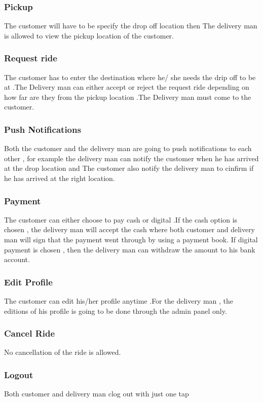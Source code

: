 \documentclass[12pt]{article}
\begin{document}
\subsubsection{Pickup} 
The customer will have to be specify the drop off location then The delivery man is allowed to view the pickup location of the customer.

\subsubsection{Request ride}
The customer has to enter the destination where he/ she needs the drip off to be at .The Delivery man can either accept or reject the request ride  depending on  how far are they from the pickup location .The Delivery man must come to the customer.

\subsubsection{Push Notifications}
Both the customer and the delivery man are going to push notifications to each other , for example the delivery man can notify the customer when he has arrived at the drop location and The customer also notify the delivery man to cinfirm if he has arrived at the right location.

\subsubsection{Payment}
The customer can either choose to pay cash or digital .If the cash option is chosen , the delivery man will accept the cash where both customer and delivery man will sign that the payment went through by using  a payment book. If digital payment is chosen , then the delivery man can withdraw the amount to his bank account.

\subsubsection{Edit Profile}
The customer  can edit his/her profile anytime .For the delivery man , the editions of his profile is going to be done through the admin panel only.

\subsubsection{Cancel Ride}
No cancellation of the ride is allowed.

\subsubsection{Logout}
Both customer and delivery man clog out with just one tap
\end{document}
